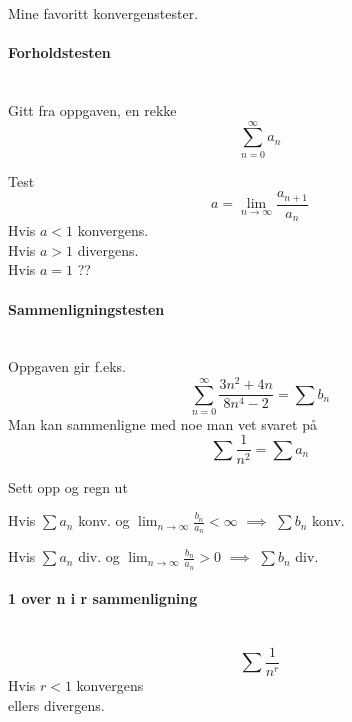 Mine favoritt konvergenstester.

\paragraph{Forholdstesten} \mbox{} \\
Gitt fra oppgaven, en rekke
$$\sum_{n=0}^{\infty} a_n$$

Test
$$a = \lim_{n \to \infty} \frac{a_{n+1}}{a_n}$$
Hvis $a < 1$ konvergens. \\
Hvis $a > 1$ divergens. \\
Hvis $a = 1$ ??



\paragraph{Sammenligningstesten} \mbox{} \\
Oppgaven gir f.eks.
$$\sum_{n=0}^{\infty}\frac{3n^2+4n}{8n^4-2} = \sum b_n$$
Man kan sammenligne med noe man vet svaret på
$$\sum \frac{1}{n^2} = \sum a_n$$

Sett opp og regn ut

Hvis $\sum a_n$ konv. og
$\lim_{n \to \infty} \frac{b_n}{a_n} < \infty$
$\implies$ $\sum b_n$ konv.

Hvis $\sum a_n$ div. og
$\lim_{n \to \infty} \frac{b_n}{a_n} > 0$
$\implies$ $\sum b_n$ div.



\paragraph{1 over n i r sammenligning} \mbox{} \\
$$\sum \frac{1}{n^r}$$
Hvis $r < 1$ konvergens\\
ellers divergens.
